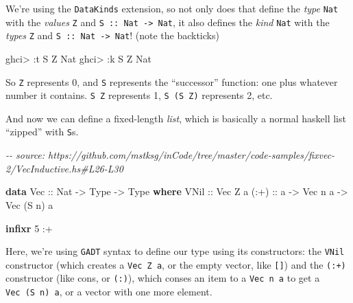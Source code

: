 \documentclass[]{article}
\newenvironment{Shaded}{}{}
\newcommand{\CommentTok}[1]{\textcolor[rgb]{0.38,0.63,0.69}{\textit{#1}}}
\newcommand{\DataTypeTok}[1]{\textcolor[rgb]{0.56,0.13,0.00}{#1}}
\newcommand{\DecValTok}[1]{\textcolor[rgb]{0.25,0.63,0.44}{#1}}
\newcommand{\KeywordTok}[1]{\textcolor[rgb]{0.00,0.44,0.13}{\textbf{#1}}}
\newcommand{\NormalTok}[1]{#1}
\newcommand{\OperatorTok}[1]{\textcolor[rgb]{0.40,0.40,0.40}{#1}}
\newcommand{\OtherTok}[1]{\textcolor[rgb]{0.00,0.44,0.13}{#1}}
\begin{document}
We're using the \texttt{DataKinds} extension, so not only does that define the
\emph{type} \texttt{Nat} with the \emph{values} \texttt{Z} and
\texttt{S\ ::\ Nat\ -\textgreater{}\ Nat}, it also defines the \emph{kind}
\texttt{Nat} with the \emph{types} \texttt{\textquotesingle{}Z} and
\texttt{\textquotesingle{}S\ ::\ Nat\ -\textgreater{}\ Nat}! (note the
backticks)

\begin{Shaded}
\begin{Highlighting}[]
\NormalTok{ghci}\OperatorTok{\textgreater{}} \OperatorTok{:}\NormalTok{t }\DataTypeTok{S} \DataTypeTok{Z}
\DataTypeTok{Nat}
\NormalTok{ghci}\OperatorTok{\textgreater{}} \OperatorTok{:}\NormalTok{k }\DataTypeTok{\textquotesingle{}S} \DataTypeTok{\textquotesingle{}Z}
\DataTypeTok{Nat}
\end{Highlighting}
\end{Shaded}

So \texttt{\textquotesingle{}Z} represents 0, and \texttt{\textquotesingle{}S}
represents the ``successor'' function: one plus whatever number it contains.
\texttt{\textquotesingle{}S\ \textquotesingle{}Z} represents 1,
\texttt{\textquotesingle{}S\ (\textquotesingle{}S\ \textquotesingle{}Z)}
represents 2, etc.

And now we can define a fixed-length \emph{list}, which is basically a normal
haskell list ``zipped'' with \texttt{S}s.

\begin{Shaded}
\begin{Highlighting}[]
\CommentTok{{-}{-} source: https://github.com/mstksg/inCode/tree/master/code{-}samples/fixvec{-}2/VecInductive.hs\#L26{-}L30}

\KeywordTok{data} \DataTypeTok{Vec}\OtherTok{ ::} \DataTypeTok{Nat} \OtherTok{{-}\textgreater{}} \DataTypeTok{Type} \OtherTok{{-}\textgreater{}} \DataTypeTok{Type} \KeywordTok{where}
    \DataTypeTok{VNil}\OtherTok{ ::} \DataTypeTok{Vec} \DataTypeTok{\textquotesingle{}Z}\NormalTok{ a}
\OtherTok{    (:+) ::}\NormalTok{ a }\OtherTok{{-}\textgreater{}} \DataTypeTok{Vec}\NormalTok{ n a }\OtherTok{{-}\textgreater{}} \DataTypeTok{Vec}\NormalTok{ (}\DataTypeTok{\textquotesingle{}S}\NormalTok{ n) a}

\KeywordTok{infixr} \DecValTok{5} \OperatorTok{:+}
\end{Highlighting}
\end{Shaded}

Here, we're using \texttt{GADT} syntax to define our type using its
constructors: the \texttt{VNil} constructor (which creates a
\texttt{Vec\ \textquotesingle{}Z\ a}, or the empty vector, like \texttt{{[}{]}})
and the \texttt{(:+)} constructor (like cons, or \texttt{(:)}), which conses an
item to a \texttt{Vec\ n\ a} to get a \texttt{Vec\ (\textquotesingle{}S\ n)\ a},
or a vector with one more element.
\end{document}
